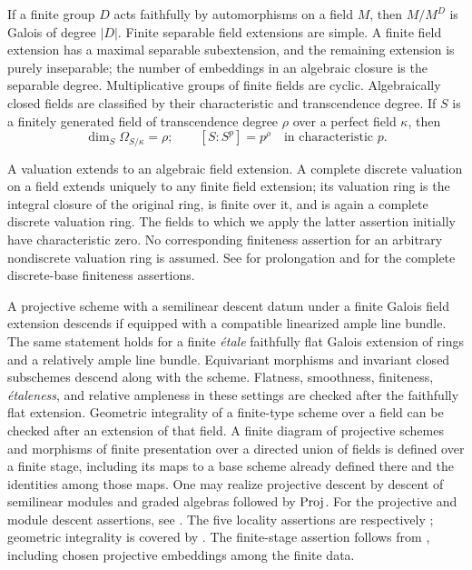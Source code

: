 \begin{foundation}\label{foundation:fields}
If a finite group $D$ acts faithfully by automorphisms on a field $M$, then $M/M^D$ is Galois of degree $|D|$. Finite separable field extensions are simple. A finite field extension has a maximal separable subextension, and the remaining extension is purely inseparable; the number of embeddings in an algebraic closure is the separable degree. Multiplicative groups of finite fields are cyclic. Algebraically closed fields are classified by their characteristic and transcendence degree. If $S$ is a finitely generated field of transcendence degree $\rho$ over a perfect field $\kappa$, then
\[
 \dim_S\Omega_{S/\kappa}=\rho;
 \qquad [S:S^p]=p^\rho\quad\text{in characteristic }p.
\]
\end{foundation}

\begin{foundation}\label{foundation:valuation}
A valuation extends to an algebraic field extension. A complete discrete valuation on a field extends uniquely to any finite field extension; its valuation ring is the integral closure of the original ring, is finite over it, and is again a complete discrete valuation ring. The fields to which we apply the latter assertion initially have characteristic zero. No corresponding finiteness assertion for an arbitrary nondiscrete valuation ring is assumed.
See \cite[Tag 00IA]{Stacks} for prolongation and
\cite[Tags 032W, 09EM and 0325]{Stacks} for the complete
discrete-base finiteness assertions.
\end{foundation}

\begin{foundation}\label{foundation:descent}
A projective scheme with a semilinear descent datum under a finite Galois field extension descends if equipped with a compatible linearized ample line bundle. The same statement holds for a finite \emph{\'etale} faithfully flat Galois extension of rings and a relatively ample line bundle. Equivariant morphisms and invariant closed subschemes descend along with the scheme. Flatness, smoothness, finiteness, \emph{\'etaleness}, and relative ampleness in these settings are checked after the faithfully flat extension. Geometric integrality of a finite-type scheme over a field can be checked after an extension of that field. A finite diagram of projective schemes and morphisms of finite presentation over a directed union of fields is defined over a finite stage, including its maps to a base scheme already defined there and the identities among those maps. One may realize projective descent by descent of semilinear modules and graded algebras followed by $\operatorname{Proj}$.
For the projective and module descent assertions, see \cite[Tags 0CCJ, 0CDR and 0D1V]{Stacks}.
The five locality assertions are respectively
\cite[Tags 02L2, 02VL, 02LA, 02VN and 0D3C]{Stacks}; geometric
integrality is covered by \cite[Tags 038K, 0384 and 054P]{Stacks}.
The finite-stage assertion follows from \cite[Tags 01ZM and 01ZP]{Stacks},
including chosen projective embeddings among the finite data.
\end{foundation}

